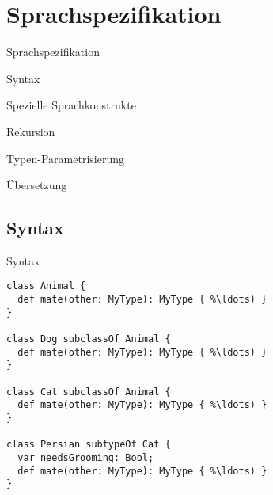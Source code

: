 \section{Sprachspezifikation}
\begin{frame}[t]{Sprachspezifikation}

	\begin{bigitemize}{3mm}
		\item Syntax
		\item Spezielle Sprachkonstrukte
		\item Rekursion
		\item Typen-Parametrisierung
		\item Übersetzung
	\end{bigitemize}
\end{frame}

\subsection{Syntax}
\begin{frame}[fragile]{Syntax}
\begin{lstlisting}[language=ooplss]
class Animal {
  def mate(other: MyType): MyType { %\ldots) }
}

class Dog subclassOf Animal {
  def mate(other: MyType): MyType { %\ldots) }
}

class Cat subclassOf Animal {
  def mate(other: MyType): MyType { %\ldots) }
}

class Persian subtypeOf Cat {
  var needsGrooming: Bool;
  def mate(other: MyType): MyType { %\ldots) }
}
\end{lstlisting}
\end{frame}

